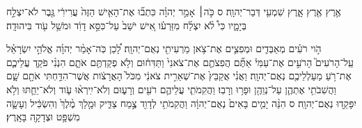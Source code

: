 \documentclass{openreader}
\begin{document}
אֶ֥רֶץ אֶ֖רֶץ אָ֑רֶץ שִׁמְעִ֖י דְּבַר־יְהוָֽה׃ ס 
כֹּ֣ה׀ אָמַ֣ר יְהוָ֗ה כִּתְב֞וּ אֶת־הָאִ֤ישׁ הַזֶּה֙ עֲרִירִ֔י גֶּ֖בֶר לֹא־יִצְלַ֣ח בְּיָמָ֑יו כִּי֩ לֹ֨א יִצְלַ֜ח מִזַּרְעֹ֗ו אִ֚ישׁ יֹשֵׁב֙ עַל־כִּסֵּ֣א דָוִ֔ד וּמֹשֵׁ֥ל עֹ֖וד בִּיהוּדָֽה׃ 

הֹ֣וי רֹעִ֗ים מְאַבְּדִ֧ים וּמְפִצִ֛ים אֶת־צֹ֥אן מַרְעִיתִ֖י נְאֻם־יְהוָֽה׃ 
לָ֠כֵן כֹּֽה־אָמַ֨ר יְהוָ֜ה אֱלֹהֵ֣י יִשְׂרָאֵ֗ל עַֽל־הָרֹעִים֮ הָרֹעִ֣ים אֶת־עַמִּי֒ אַתֶּ֞ם הֲפִצֹתֶ֤ם אֶת־צֹאנִי֙ וַתַּדִּח֔וּם וְלֹ֥א פְקַדְתֶּ֖ם אֹתָ֑ם הִנְנִ֨י פֹקֵ֧ד עֲלֵיכֶ֛ם אֶת־רֹ֥עַ מַעַלְלֵיכֶ֖ם נְאֻם־יְהוָֽה׃ 
וַאֲנִ֗י אֲקַבֵּץ֙ אֶת־שְׁאֵרִ֣ית צֹאנִ֔י מִכֹּל֙ הָאֲרָצֹ֔ות אֲשֶׁר־הִדַּ֥חְתִּי אֹתָ֖ם שָׁ֑ם וַהֲשִׁבֹתִ֥י אֶתְהֶ֛ן עַל־נְוֵהֶ֖ן וּפָר֥וּ וְרָבֽוּ׃ 
וַהֲקִמֹתִ֧י עֲלֵיהֶ֛ם רֹעִ֖ים וְרָע֑וּם וְלֹא־יִֽירְא֨וּ עֹ֧וד וְלֹא־יֵחַ֛תּוּ וְלֹ֥א יִפָּקֵ֖דוּ נְאֻם־יְהוָֽה׃ ס 
הִנֵּ֨ה יָמִ֤ים בָּאִים֙ נְאֻם־יְהוָ֔ה וַהֲקִמֹתִ֥י לְדָוִ֖ד צֶ֣מַח צַדִּ֑יק וּמָ֤לַךְ מֶ֨לֶךְ֙ וְהִשְׂכִּ֔יל וְעָשָׂ֛ה מִשְׁפָּ֥ט וּצְדָקָ֖ה בָּאָֽרֶץ׃ 
\end{document}
